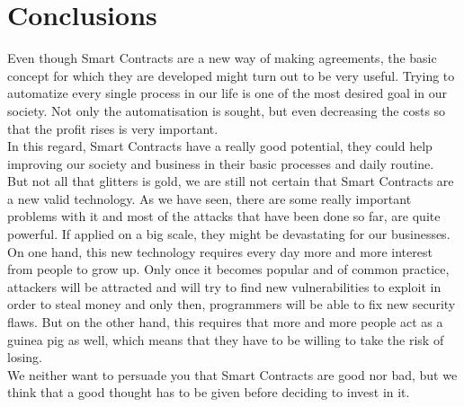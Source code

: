 \section{Conclusions}
Even though Smart Contracts are a new way of making agreements, the basic concept for which they are developed might turn out to be very useful. Trying to automatize every single process in our life is one of the most desired goal in our society. Not only the automatisation is sought, but even decreasing the costs so that the profit rises is very important.\\
In this regard, Smart Contracts have a really good potential, they could help improving our society and business in their basic processes and daily routine.\\
But not all that glitters is gold, we are still not  certain that Smart Contracts are a new valid technology. As we have seen, there are some really important problems with it and most of the attacks that have been done so far, are quite powerful. If applied on a big scale, they might be devastating for our businesses.\\
On one hand, this new technology requires every day more and more interest from people to grow up. Only once it becomes popular and of common practice, attackers will be attracted and will try to find new vulnerabilities to exploit in order to steal money and only then, programmers will be able to fix new security flaws. But on the other hand, this requires that more and more people act as a guinea pig as well, which means that they have to be willing to take the risk of losing.\\
We neither  want to persuade you that Smart Contracts are good nor bad, but we think that a good thought has to be given before deciding to invest in it.



